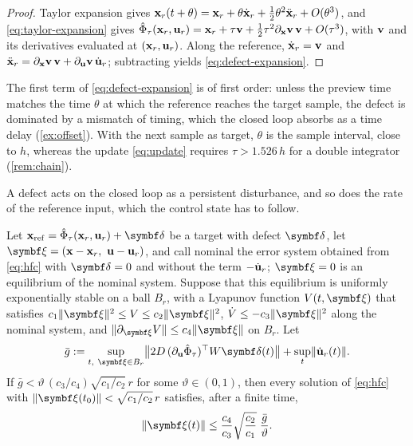 \begin{proof}
Taylor expansion gives
$\mathbf{x}_r(t+\theta) = \mathbf{x}_r + \theta\dot{\mathbf{x}}_r + \frac12\theta^2\ddot{\mathbf{x}}_r + O(\theta^3)$, and
\eqref{eq:taylor-expansion} gives
$\hat\Phi_\tau(\mathbf{x}_r,\mathbf{u}_r) = \mathbf{x}_r + \tau\mathbf{v} + \frac12\tau^2\partial_{\mathbf{x}}\mathbf{v}\,\mathbf{v} + O(\tau^3)$, with
$\mathbf{v}$ and its derivatives evaluated at $(\mathbf{x}_r,\mathbf{u}_r)$.
Along the reference, $\dot{\mathbf{x}}_r = \mathbf{v}$ and $\ddot{\mathbf{x}}_r = \partial_{\mathbf{x}}\mathbf{v}\,\mathbf{v} + \partial_{\mathbf{u}}\mathbf{v}\,
\dot{\mathbf{u}}_r$; subtracting yields \eqref{eq:defect-expansion}.
\end{proof}

The first term of \eqref{eq:defect-expansion} is of first order: unless the preview time matches the
time $\theta$ at which the reference reaches the target sample, the defect is dominated by a
mismatch of timing, which the closed loop absorbs as a time delay (\cref{ex:offset}).
With the next sample as target, $\theta$ is the sample interval, close to $h$, whereas the update
\eqref{eq:update} requires $\tau > 1.526\,h$ for a double integrator (\cref{rem:chain}).

A defect acts on the closed loop as a persistent disturbance, and so does the rate of the reference
input, which the control state has to follow.

\begin{theorem}\label{thm:offset}
Let $\bxref = \hat\Phi_\tau(\bx_r,\bu_r) + \bdelta$ be a target with defect $\bdelta$, let
$\bxi = (\bx - \bx_r,\ \bu - \bu_r)$, and call nominal the error system obtained from \eqref{eq:hfc}
with $\bdelta = 0$ and without the term $-\dot{\mathbf{u}}_r$; $\bxi = 0$ is an equilibrium of the nominal
system.
Suppose that this equilibrium is uniformly exponentially stable on a ball $B_r$, with a Lyapunov
function $V(t,\bxi)$ that satisfies $c_1\norm{\bxi}^2 \le V \le c_2\norm{\bxi}^2$,
$\dot V \le -c_3\norm{\bxi}^2$ along the nominal system, and $\norm{\partial_{\bxi}V} \le
c_4\norm{\bxi}$ on $B_r$. Let
\begin{equation}\label{eq:gbar}
    \bar g := \sup_{t,\ \bxi\in B_r}
        \norm[\big]{2D\,(\partial_{\bu}\hat\Phi_\tau)^\T W\bdelta(t)}
        + \sup_{t}\norm{\dot\bu_r(t)} .
\end{equation}
If $\bar g < \vartheta\,(c_3/c_4)\sqrt{c_1/c_2}\,r$ for some $\vartheta\in(0,1)$, then every solution of
\eqref{eq:hfc} with $\norm{\bxi(t_0)} < \sqrt{c_1/c_2}\,r$ satisfies, after a finite time,
\begin{equation}\label{eq:offset-bound}
    \norm{\bxi(t)} \le \frac{c_4}{c_3}\sqrt{\frac{c_2}{c_1}}\;\frac{\bar g}{\vartheta}.
\end{equation}
\end{theorem}

